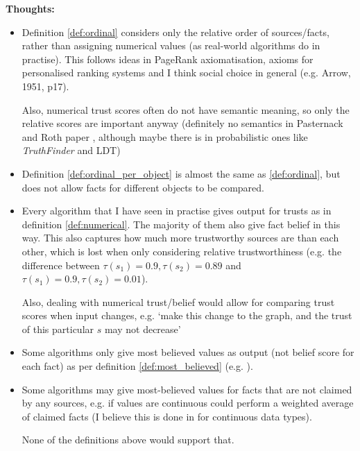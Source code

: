 \documentclass{article}
\theoremstyle{definition}
\theoremstyle{plain}
\begin{document}
\textbf{Thoughts:}
\begin{itemize}

\item Definition \ref{def:ordinal} considers only the relative order of
sources/facts, rather than assigning numerical values (as real-world algorithms
do in practise). This follows ideas in PageRank axiomatisation{\cite{altman}},
axioms for personalised ranking systems{\cite{altman_personalised}} and I think
social choice in general (e.g. Arrow, 1951, p17).

Also, numerical trust scores often do not have semantic meaning, so only the
relative scores are important anyway (definitely no semantics in Pasternack and
Roth paper \cite{pasternack}, although maybe there is in probabilistic ones
like \emph{TruthFinder}\cite{yin_han_yu} and LDT\cite{zhang_qi_tang})

\item Definition \ref{def:ordinal_per_object} is almost the same as
\ref{def:ordinal}, but does not allow facts for different objects to be
compared.

\item Every algorithm that I have seen in practise gives output for trusts as
in definition \ref{def:numerical}. The majority of them also give fact belief
in this way. This also captures how much more trustworthy sources are than each
other, which is lost when only considering relative trustworthiness (e.g. the
difference between $\tau(s_1) = 0.9, \tau(s_2) = 0.89$ and $\tau(s_1) = 0.9,
\tau(s_2) = 0.01$).

Also, dealing with numerical trust/belief would allow for comparing trust
scores when input changes, e.g. `make this change to the graph, and the trust
of this particular $s$ may not decrease'

\item Some algorithms only give most believed values as output (not belief
score for each fact) as per definition \ref{def:most_believed} (e.g.
\cite{li_conflicts}).

\item Some algorithms may give most-believed values for facts that are not
claimed by any sources, e.g. if values are continuous could perform a weighted
average of claimed facts (I believe this is done in \cite{li_conflicts} for
continuous data types).

None of the definitions above would support that.

\end{itemize}
\end{document}
